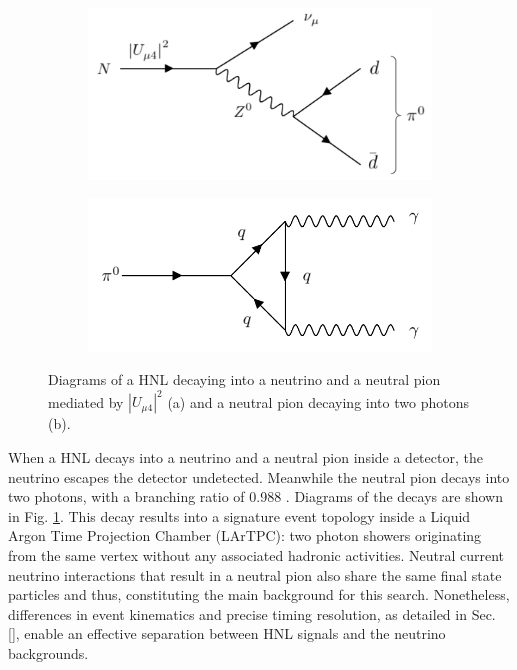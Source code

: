 \begin{figure}[htbp!]
\begin{subfigure}[h]{0.49\linewidth}
\centering    
\includegraphics[width=\linewidth]{N_to_pi0_edit}
\caption{}
\end{subfigure}
\hfill
\begin{subfigure}[h]{0.49\linewidth}
\centering    
\includegraphics[width=\linewidth]{pi0_to_gam}
\caption{}
\end{subfigure}%
\caption[decayDiagram]{
Diagrams of a HNL decaying into a neutrino and a neutral pion mediated by $|U_{\mu4}|^{2}$ (a) and a neutral pion decaying into two photons (b).
}\label{fig:decayDiagram}
\end{figure}

When a HNL decays into a neutrino and a neutral pion inside a detector, the neutrino escapes the detector undetected.
Meanwhile the neutral pion decays into two photons, with a branching ratio of 0.988 \cite{pi0}. 
Diagrams of the decays are shown in Fig. \ref{fig:decayDiagram}.
This decay results into a signature event topology inside a Liquid Argon Time Projection Chamber (LArTPC): two photon showers originating from the same vertex without any associated hadronic activities.
Neutral current neutrino interactions that result in a neutral pion also share the same final state particles and thus, constituting the main background for this search.
Nonetheless, differences in event kinematics and precise timing resolution, as detailed in Sec. \ref{}, enable an effective separation between HNL signals and the neutrino backgrounds. 

